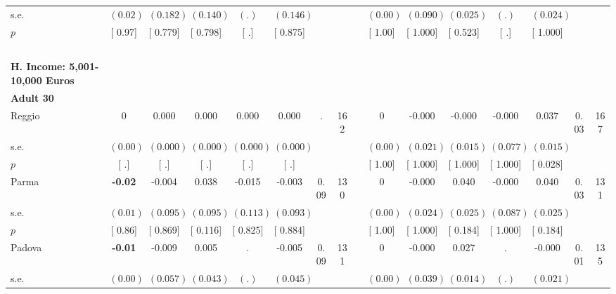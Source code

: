 \begin{longtable}{L{8em} c c c c c c c p{1em} c c c c c c c}
\quad \quad \quad \quad s.e.& $ (     0.02)$ & $ (    0.182)$ & $ (    0.140)$ & $ (        .)$ & $ (    0.146)$ & & & & $ (     0.00)$ & $ (    0.090)$ & $ (    0.025)$ & $ (        .)$ & $ (    0.024)$ & &  \\*
\quad \quad \quad \quad $ p$ & [     0.97] & [    0.779] & [    0.798] & [        .] & [    0.875] & & & & [     1.00] & [    1.000] & [    0.523] & [        .] & [    1.000] & &  \\[1em]
~\\[1em]
\textbf{H. Income: 5,001-10,000 Euros} \\*
\quad \quad \textbf{Adult 30} & & & & & & & & & & & & & & & \\* 
\quad \quad \quad Reggio& 0 &     0.000 &     0.000 &     0.000 &     0.000 &         . &       162 & & 0 &    -0.000 &    -0.000 &    -0.000 & $ \mathbf{    0.037}$ &      0.03 &       167  \\*
\quad \quad \quad \quad s.e.& $ (     0.00)$ & $ (    0.000)$ & $ (    0.000)$ & $ (    0.000)$ & $ (    0.000)$ & & & & $ (     0.00)$ & $ (    0.021)$ & $ (    0.015)$ & $ (    0.077)$ & $ (    0.015)$ & &  \\*
\quad \quad \quad \quad $ p$ & [        .] & [        .] & [        .] & [        .] & [        .] & & & & [     1.00] & [    1.000] & [    1.000] & [    1.000] & [    0.028] & &  \\[1em]
\quad \quad \quad Parma& \textbf{    -0.02} &    -0.004 &     0.038 &    -0.015 &    -0.003 &      0.09 &       130 & & 0 &    -0.000 &     0.040 &    -0.000 &     0.040 &      0.03 &       131  \\*
\quad \quad \quad \quad s.e.& $ (     0.01)$ & $ (    0.095)$ & $ (    0.095)$ & $ (    0.113)$ & $ (    0.093)$ & & & & $ (     0.00)$ & $ (    0.024)$ & $ (    0.025)$ & $ (    0.087)$ & $ (    0.025)$ & &  \\*
\quad \quad \quad \quad $ p$ & [     0.86] & [    0.869] & [    0.116] & [    0.825] & [    0.884] & & & & [     1.00] & [    1.000] & [    0.184] & [    1.000] & [    0.184] & &  \\[1em]
\quad \quad \quad Padova& \textbf{    -0.01} &    -0.009 &     0.005 &         . &    -0.005 &      0.09 &       131 & & 0 &    -0.000 &     0.027 &         . &    -0.000 &      0.01 &       135  \\*
\quad \quad \quad \quad s.e.& $ (     0.00)$ & $ (    0.057)$ & $ (    0.043)$ & $ (        .)$ & $ (    0.045)$ & & & & $ (     0.00)$ & $ (    0.039)$ & $ (    0.014)$ & $ (        .)$ & $ (    0.021)$ & &  \\*

\end{longtable}

